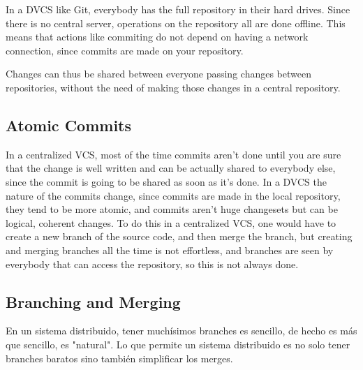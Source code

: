 \documentclass[%
	final,
	notitlepage,
	narroweqnarray,
	inline,
	twoside,
	]{ieee}
\begin{document}
In a DVCS like Git, everybody has the full repository in their hard drives.
Since there is no central server, operations on the repository all are done 
offline. This means that actions like commiting do not depend on having a 
network connection, since commits are made on your repository.

Changes can thus be shared between everyone passing changes between repositories, 
without the need of making those changes in a central repository.



\subsection{Atomic Commits}

In a centralized VCS, most of the time commits aren't done until you are sure that 
the change is well written and can be actually shared to everybody else, since the 
commit is going to be shared as soon as it's done. In a DVCS the nature of the commits 
change, since commits are made in the local repository, they tend to be more atomic, 
and commits aren't huge changesets but can be logical, coherent changes.
To do this in a centralized VCS, one would have to create a new branch of the source code, 
and then merge the branch, but creating and merging branches all the time is 
not effortless, and branches are seen by everybody that can access the repository, 
so this is not always done.

\subsection{Branching and Merging}

En un sistema distribuido, tener muchísimos branches es sencillo, de hecho 
es más que sencillo, es "natural". Lo que permite un sistema distribuido es 
no solo tener branches baratos sino también simplificar los merges. 
\end{document}
